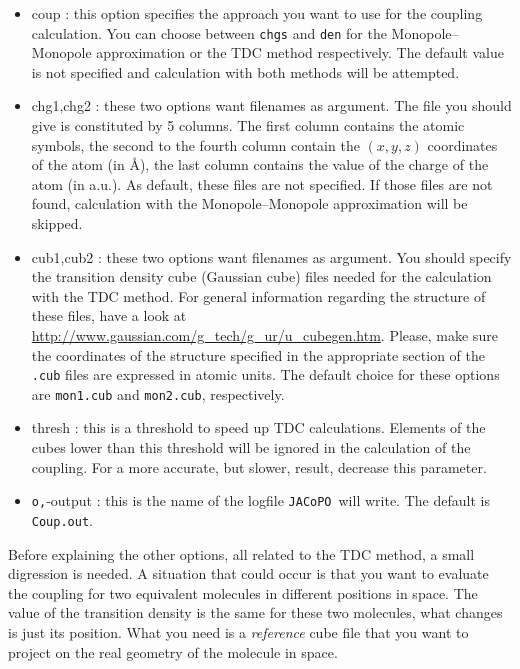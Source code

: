 \documentclass[a4paper]{article}
\newcommand{\jacopo}{\texttt{JACoPO}}
\begin{document}
\begin{itemize}

 \item \verb --coup : this option specifies the approach you want to use for the coupling calculation. You can choose between \verb|chgs| and \verb|den| for the Monopole--Monopole approximation or the TDC method respectively. The default value is not specified and calculation with both methods will be attempted.
 
 \item \verb --chg1,chg2 : these two options want filenames as argument. The file you should give is constituted by 5 columns. The first column contains the atomic symbols, the second to the fourth column contain the $(x, y, z)$ coordinates of the atom (in \AA{}), the last column contains the value of the charge of the atom (in a.u.). As default, these files are not specified. If those files are not found, calculation with the Monopole--Monopole approximation will be skipped.
 
 \item \verb --cub1,cub2 : these two options want filenames as argument. You should specify the transition density cube (Gaussian cube) files needed for the calculation with the TDC method. For general information regarding the structure of these files, have a look at \url{http://www.gaussian.com/g_tech/g_ur/u_cubegen.htm}. Please, make sure the coordinates of the structure specified in the appropriate section of the \verb|.cub| files are expressed in atomic units. The default choice for these options are \verb|mon1.cub| and \verb|mon2.cub|, respectively.

 \item \verb --thresh : this is a threshold to speed up TDC calculations. Elements of the cubes lower than this threshold will be ignored in the calculation of the coupling. For a more accurate, but slower, result, decrease this parameter.
 
 \item \verb -o,--output : this is the name of the logfile \jacopo\ will write. The default is \verb|Coup.out|.
 
\end{itemize}

Before explaining the other options, all related to the TDC method, a small digression is needed. A situation that could occur is that you want to evaluate the coupling for two equivalent molecules in different positions in space. The value of the transition density is the same for these two molecules, what changes is just its position. What you need is a \textit{reference} cube file that you want to project on the real geometry of the molecule in space.
\end{document}
